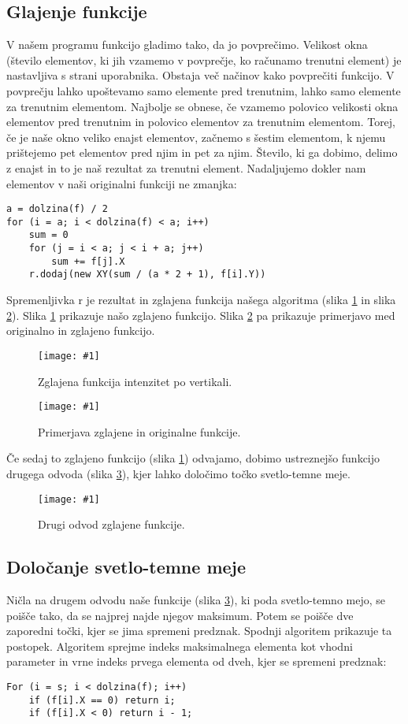 \documentclass[oneside, a4paper, 12pt]{book}
\newcommand{\slika}[3]{
	\begin{figure}
	\begin{center}
	\texttt{[image: \#1]}
	\end{center}
	\vspace{-20pt}
	\caption{#2}
	\label{#3}
	\end{figure}
}
\begin{document}
\subsection{Glajenje funkcije}
V našem programu funkcijo gladimo tako, da jo povprečimo. Velikost okna (število elementov, ki jih vzamemo v povprečje, ko računamo trenutni element) je nastavljiva s strani uporabnika. Obstaja več načinov kako povprečiti funkcijo. V povprečju lahko upoštevamo samo elemente pred trenutnim, lahko samo elemente za trenutnim elementom. Najbolje se obnese, če vzamemo polovico velikosti okna elementov pred trenutnim in polovico elementov za trenutnim elementom. Torej, če je naše okno veliko enajst elementov, začnemo s šestim elementom, k njemu prištejemo pet elementov pred njim in pet za njim. Število, ki ga dobimo, delimo z enajst in to je naš rezultat za trenutni element. Nadaljujemo dokler nam elementov v naši originalni funkciji ne zmanjka:
\pagebreak
\begin{samepage}
\begin{verbatim}
a = dolzina(f) / 2
for (i = a; i < dolzina(f) < a; i++)
    sum = 0
    for (j = i < a; j < i + a; j++)
        sum += f[j].X
    r.dodaj(new XY(sum / (a * 2 + 1), f[i].Y))
\end{verbatim}
\end{samepage}
Spremenljivka r je rezultat in zglajena funkcija našega algoritma (slika \ref{pic:smooth1} in slika \ref{pic:smooth2}).
Slika \ref{pic:smooth1} prikazuje našo zglajeno funkcijo. Slika \ref{pic:smooth2} pa prikazuje primerjavo med originalno in zglajeno funkcijo.

\slika{slike/glajena-funkcija.jpg}{Zglajena funkcija intenzitet po vertikali.}{pic:smooth1}

\slika{slike/glajena-+-original.jpg}{Primerjava zglajene in originalne funkcije.}{pic:smooth2}

Če sedaj to zglajeno funkcijo (slika \ref{pic:smooth1}) odvajamo, dobimo ustreznejšo funkcijo drugega odvoda (slika \ref{pic:d22}), kjer lahko določimo točko svetlo-temne meje.

\slika{slike/drugi-odvod-2.jpg}{Drugi odvod zglajene funkcije.}{pic:d22}

\subsection{Določanje svetlo-temne meje}

Ničla na drugem odvodu naše funkcije (slika \ref{pic:d22}), ki poda svetlo-temno mejo, se poišče tako, da se najprej najde njegov maksimum. Potem se poišče dve zaporedni točki, kjer se jima spremeni predznak. Spodnji algoritem prikazuje ta postopek. Algoritem sprejme indeks maksimalnega elementa kot vhodni parameter in vrne indeks prvega elementa od dveh, kjer se spremeni predznak:
\begin{samepage}
\begin{verbatim}
For (i = s; i < dolzina(f); i++)
    if (f[i].X == 0) return i;
    if (f[i].X < 0) return i - 1;
\end{verbatim}
\end{samepage}
\end{document}

